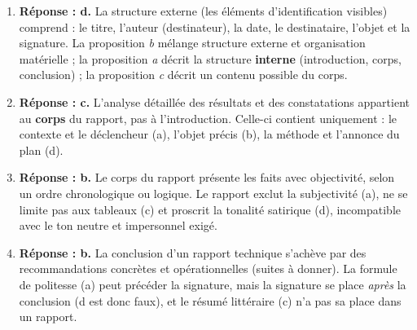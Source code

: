 \documentclass[11pt]{article}
\newcommand{\cle}[1]{{\popxbold\color{popdark}#1}}
\begin{document}
\begin{corrige}
\begin{enumerate}
    \item \textbf{Réponse : d.} La structure externe (les éléments d'identification visibles) comprend : le titre, l'auteur (destinateur), la date, le destinataire, l'objet et la signature. La proposition \emph{b} mélange structure externe et organisation matérielle ; la proposition \emph{a} décrit la structure \textbf{interne} (introduction, corps, conclusion) ; la proposition \emph{c} décrit un contenu possible du corps.
    \item \textbf{Réponse : c.} L'analyse détaillée des résultats et des constatations appartient au \textbf{corps} du rapport, pas à l'introduction. Celle-ci contient uniquement : le contexte et le déclencheur (a), l'objet précis (b), la méthode et l'annonce du plan (d).
    \item \textbf{Réponse : b.} Le corps du rapport présente les faits avec \cle{objectivité}, selon un ordre chronologique ou logique. Le rapport exclut la subjectivité (a), ne se limite pas aux tableaux (c) et proscrit la tonalité satirique (d), incompatible avec le ton neutre et impersonnel exigé.
    \item \textbf{Réponse : b.} La conclusion d'un rapport technique s'achève par des \cle{recommandations} concrètes et opérationnelles (suites à donner). La formule de politesse (a) peut précéder la signature, mais la signature se place \emph{après} la conclusion (d est donc faux), et le résumé littéraire (c) n'a pas sa place dans un rapport.
\end{enumerate}
\end{corrige}
\end{document}
